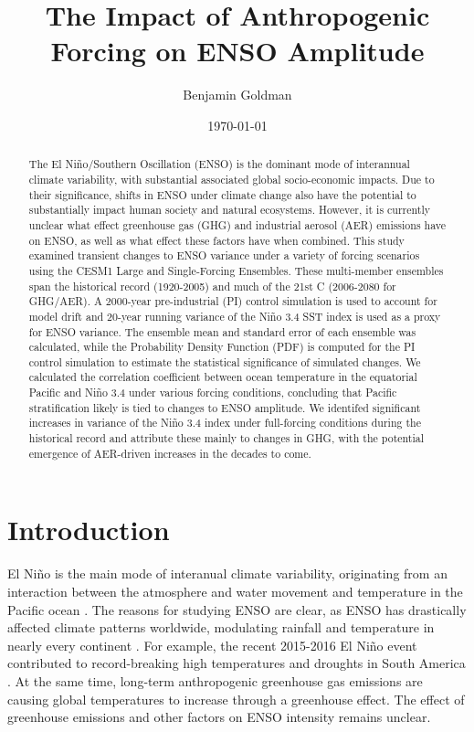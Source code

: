 \documentclass[12pt]{article}
\author{Benjamin Goldman}
\date{\today}
\title{The Impact of Anthropogenic Forcing on ENSO Amplitude}
\begin{document}
    
\maketitle
\begin{abstract}

    The El Niño/Southern Oscillation (ENSO) is the dominant mode of interannual climate variability, with substantial associated global socio-economic impacts. Due to their significance, shifts in ENSO under climate change also have the potential to substantially impact human society and natural ecosystems. However, it is currently unclear what effect greenhouse gas (GHG) and industrial aerosol (AER) emissions have on ENSO, as well as what effect these factors have when combined. This study examined transient changes to ENSO variance under a variety of forcing scenarios using the CESM1 Large and Single-Forcing Ensembles. These multi-member ensembles span the historical record (1920-2005) and much of the 21st C (2006-2080 for GHG/AER). A 2000-year pre-industrial (PI) control simulation is used to account for model drift and 20-year running variance of the Niño 3.4 SST index is used as a proxy for ENSO variance. The ensemble mean and standard error of each ensemble was calculated, while the Probability Density Function (PDF) is computed for the PI control simulation to estimate the statistical significance of simulated changes. We calculated the correlation coefficient between ocean temperature in the equatorial Pacific and Niño 3.4 under various forcing conditions, concluding that Pacific stratification likely is tied to changes to ENSO amplitude. We identifed significant increases in variance of the Niño 3.4 index under full-forcing conditions during the historical record and attribute these mainly to changes in GHG, with the potential emergence of AER-driven increases in the decades to come.

\end{abstract}

\section{Introduction}
El Niño is the main mode of interanual climate variability, originating from an interaction between the atmosphere and water movement and temperature in the Pacific ocean \parencite{bjerknes1969atmospheric}. The reasons for studying ENSO are clear, as ENSO has drastically affected climate patterns worldwide, modulating rainfall and temperature in nearly every continent \parencite{ropelewski1987global}. For example, the recent 2015-2016 El Niño event contributed to record-breaking high temperatures and droughts in South America \parencite{jimenez2016record}. At the same time, long-term anthropogenic greenhouse gas emissions are causing global temperatures to increase through a greenhouse effect. The effect of greenhouse emissions and other factors on ENSO intensity remains unclear.
\end{document}
